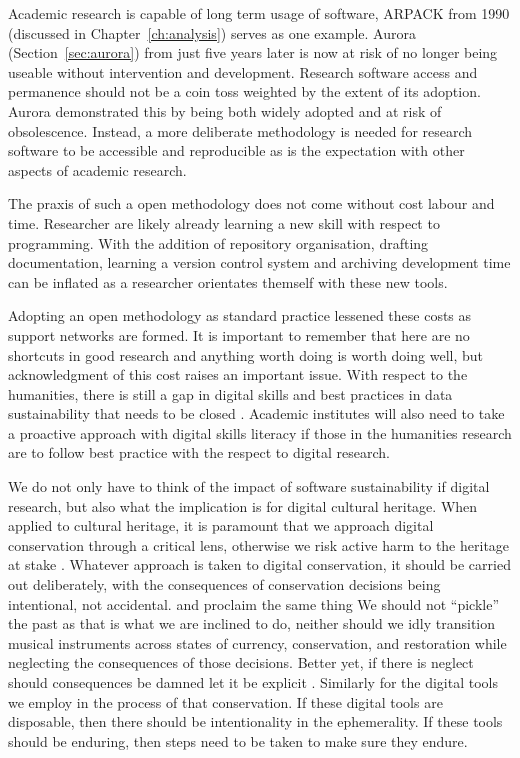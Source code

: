 Academic research is capable of long term usage of software, ARPACK from 1990
\cite{lehoucq_arpack_1998} (discussed in Chapter~\ref{ch:analysis}) serves as
one example. Aurora (Section~\ref{sec:aurora}) from just five years later is now
at risk of no longer being useable without intervention and development.
Research software access and permanence should not be a coin toss weighted by
the extent of its adoption. Aurora demonstrated this by being both widely
adopted and at risk of obsolescence. Instead, a more deliberate methodology is
needed for research software to be accessible and reproducible as is the
expectation with other aspects of academic research.

The praxis of such a open methodology does not come without cost labour and
time. Researcher are likely already learning a new skill with respect to
programming. With the addition of repository organisation, drafting
documentation, learning a version control system and archiving development time
can be inflated as a researcher orientates themself with these new tools.

Adopting an open methodology as standard practice lessened these costs as
support networks are formed. It is important to remember that here are no
shortcuts in good research and anything worth doing is worth doing well, but
acknowledgment of this cost raises an important issue. With respect to the
humanities, there is still a gap in  digital skills and best practices in data
sustainability that needs to be closed \cite{taylor_shaping_2022}. Academic
institutes will also need to take a proactive approach with digital skills
literacy if those in the humanities research are to follow best practice with
the respect to digital research.

We do not only have to think of the impact of software sustainability if digital
research, but also what the implication is for digital cultural heritage. When
applied to cultural heritage, it is paramount that we approach digital
conservation through a critical lens, otherwise we risk active harm to the
heritage at stake
\cite{rubio_work_2020,schwarz_disk_2006,parry_museums_2010,cieply_afterlife_2007}.
Whatever approach is taken to digital conservation, it should be carried out
deliberately, with the consequences of conservation decisions being intentional,
not accidental. \textcite{barclay_preservation_2005} and
\textcite{desilvey_curated_2017} proclaim the same thing We should not
``pickle''\cite{desilvey_curated_2017} the past as that is what we are inclined
to do, neither should we idly transition musical instruments across states of
currency, conservation, and restoration while neglecting the consequences of
those decisions. Better yet, if there is neglect should consequences be damned
let it be explicit \cite[p.~75-76]{barclay_preservation_2005}. Similarly for the
digital tools we employ in the process of that conservation. If these digital
tools are disposable, then there should be intentionality in the ephemerality.
If these tools should be enduring, then steps need to be taken to make sure they
endure.


